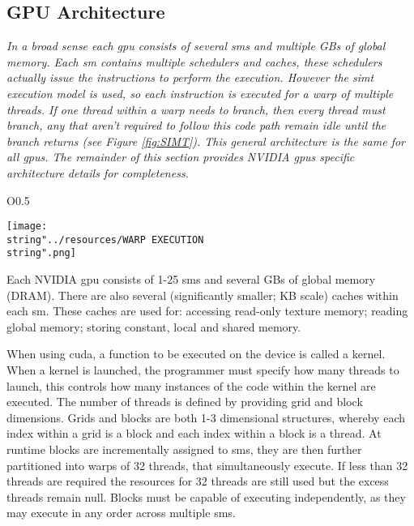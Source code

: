     \subsection{GPU Architecture\label{sub:NVIDIA-GPU-Architecture}}
      \emph{In a broad sense each \gls{gpu} consists of several \glspl{sm} and multiple GBs of global memory. Each \gls{sm} contains multiple schedulers and caches, these schedulers actually issue the instructions to perform the execution. However the \gls{simt} execution model is used, so each instruction is executed for a warp of multiple threads. If one thread within a warp needs to branch, then every thread must branch, any that aren't required to follow this code path remain idle until the branch returns (see Figure \ref{fig:SIMT}). This general architecture is the same for all \glspl{gpu}. The remainder of this section  provides NVIDIA \glspl{gpu} specific architecture details for completeness.}\\

\begin{wrapfigure}{O}{0.5\columnwidth}%
  \begin{centering}
    \texttt{[image: \\string"../resources/WARP EXECUTION\\string".png]}
  \par\end{centering}
  \protect\caption{\label{fig:SIMT}Illustration of the potential execution order by two different warps of the same code block. \cite{PM13}}
\end{wrapfigure}%

      Each NVIDIA \gls{gpu} consists of 1-25 \glspl{sm} and several GBs of global memory (DRAM). There are also several (significantly smaller; KB scale) caches within each \gls{sm}. These caches are used for: accessing read-only texture memory; reading global memory; storing constant, local and shared memory. 

      When using \gls{cuda}, a function to be executed on the device is called a kernel. When a kernel is launched, the programmer must specify how many threads to launch, this controls how many instances of the code within the kernel are executed. The number of threads is defined by providing grid and block dimensions. Grids and blocks are both 1-3 dimensional structures, whereby each index within a grid is a block and each index within a block is a thread. At runtime blocks are incrementally assigned to \glspl{sm}, they are then further partitioned into warps of 32 threads, that simultaneously execute. If less than 32 threads are required the resources for 32 threads are still used but the excess threads remain null. Blocks must be capable of executing independently, as they may execute in any order across multiple \glspl{sm}.


